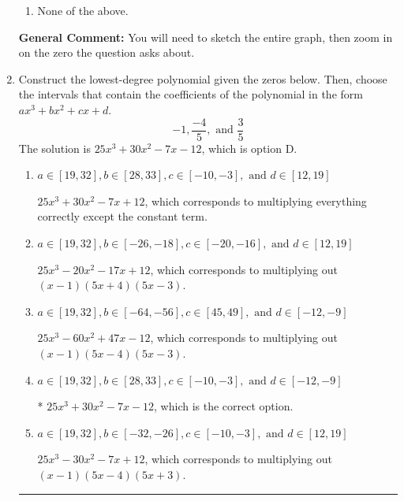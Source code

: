 \documentclass{extbook}[14pt]
\newcommand{\litem}[1]{\item #1

\rule{\textwidth}{0.4pt}}
\begin{document}
\begin{enumerate}
{\begin{enumerate}[label=\Alph*.]
\item None of the above.\end{enumerate}
\textbf{General Comment:} You will need to sketch the entire graph, then zoom in on the zero the question asks about.
}
\litem{
Construct the lowest-degree polynomial given the zeros below. Then, choose the intervals that contain the coefficients of the polynomial in the form $ax^3+bx^2+cx+d$.
\[ -1, \frac{-4}{5}, \text{ and } \frac{3}{5} \]The solution is \( 25x^{3} +30 x^{2} -7 x -12 \), which is option D.\begin{enumerate}[label=\Alph*.]
\item \( a \in [19, 32], b \in [28, 33], c \in [-10, -3], \text{ and } d \in [12, 19] \)

$25x^{3} +30 x^{2} -7 x + 12$, which corresponds to multiplying everything correctly except the constant term.
\item \( a \in [19, 32], b \in [-26, -18], c \in [-20, -16], \text{ and } d \in [12, 19] \)

$25x^{3} -20 x^{2} -17 x + 12$, which corresponds to multiplying out $(x -1)(5x + 4)(5x -3)$.
\item \( a \in [19, 32], b \in [-64, -56], c \in [45, 49], \text{ and } d \in [-12, -9] \)

$25x^{3} -60 x^{2} +47 x -12$, which corresponds to multiplying out $(x -1)(5x -4)(5x -3)$.
\item \( a \in [19, 32], b \in [28, 33], c \in [-10, -3], \text{ and } d \in [-12, -9] \)

* $25x^{3} +30 x^{2} -7 x -12$, which is the correct option.
\item \( a \in [19, 32], b \in [-32, -26], c \in [-10, -3], \text{ and } d \in [12, 19] \)

$25x^{3} -30 x^{2} -7 x + 12$, which corresponds to multiplying out $(x -1)(5x -4)(5x + 3)$.
\end{enumerate}

}
\end{enumerate}
\end{document}
